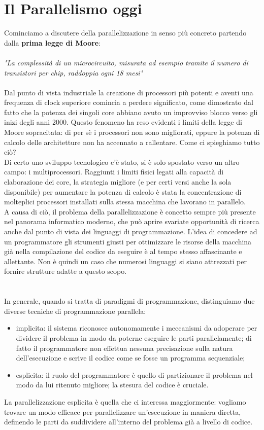 \chapter{Il Parallelismo oggi}
Cominciamo a discutere della parallelizzazione in senso più concreto partendo dalla \textbf{prima legge di Moore}:\\\\
\textit{"La complessità di un microcircuito, misurata ad esempio tramite il numero di transistori per chip, raddoppia ogni 18 mesi"}\\\\
Dal punto di vista industriale la creazione di processori più potenti e aventi una frequenza di clock superiore comincia a perdere significato, come dimostrato dal fatto che la potenza dei singoli core abbiano avuto un improvviso blocco verso gli inizi degli anni 2000. Questo fenomeno ha reso evidenti i limiti della legge di Moore sopracitata: di per sè i processori non sono migliorati, eppure la potenza di calcolo delle architetture non ha accennato a rallentare. Come ci spieghiamo tutto ciò?\\
Di certo uno sviluppo tecnologico c'è stato, si è solo spostato verso un altro campo: i multiprocessori. Raggiunti i limiti fisici legati alla capacità di elaborazione dei core, la strategia migliore (e per certi versi anche la sola disponibile) per aumentare la potenza di calcolo è stata la concentrazione di molteplici processori installati sulla stessa macchina che lavorano in parallelo.\\
A causa di ciò, il problema della parallelizzazione è concetto sempre più presente nel panorama informatico moderno, che può aprire svariate opportunità di ricerca anche dal punto di vista dei linguaggi di programmazione. L'idea di concedere ad un programmatore gli strumenti giusti per ottimizzare le risorse della macchina già nella compilazione del codice da eseguire è al tempo stesso affascinante e allettante. Non è quindi un caso che numerosi linguaggi si siano attrezzati per fornire strutture adatte a questo scopo.\\\\\\
In generale, quando si tratta di paradigmi di programmazione, distinguiamo due diverse tecniche di programmazione parallela:
\begin{itemize}
\item{implicita: il sistema riconosce autonomamente i meccanismi da adoperare per dividere il problema in modo da poterne eseguire le parti parallelamente; di fatto il programmatore non effettua nessuna precisazione sulla natura dell'esecuzione e scrive il codice come se fosse un programma sequenziale;}
\item{esplicita: il ruolo del programmatore è quello di partizionare il problema nel modo da lui ritenuto migliore; la stesura del codice è cruciale.}
\end{itemize}
La parallelizzazione esplicita è quella che ci interessa maggiormente: vogliamo trovare un modo efficace per parallelizzare un'esecuzione in maniera diretta, definendo le parti da suddividere all'interno del problema già a livello di codice.

